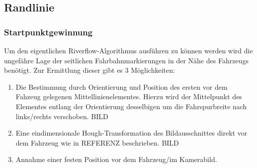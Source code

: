 \subsection{Randlinie}
\subsubsection{Startpunktgewinnung}
Um den eigentlichen Riverflow-Algorithmus ausführen zu können werden wird die ungefähre Lage der seitlichen Fahrbahnmarkierungen in der Nähe des Fahrzeugs benötigt. Zur Ermittlung dieser gibt es 3 Möglichkeiten:
\begin{enumerate}
\item \label{item:solidline:startpoints:dashedline}
Die Bestimmung durch Orientierung und Position des ersten vor dem Fahzeug gelegenen Mittellinienelementes. Hierzu wird der Mittelpunkt des Elementes entlang der Orientierung desselbigen um die Fahrspurbreite nach links/rechts verschoben. BILD
\item \label{item:solidline:startpoints:hough}
Eine eindimensionale Hough-Transformation des Bildausschnittes direkt vor dem Fahrzeug wie in REFERENZ beschrieben. BILD
\item \label{item:solidline:startpoints:fixed}
Annahme einer festen Position vor dem Fahrzeug/im Kamerabild.
\end{enumerate}

